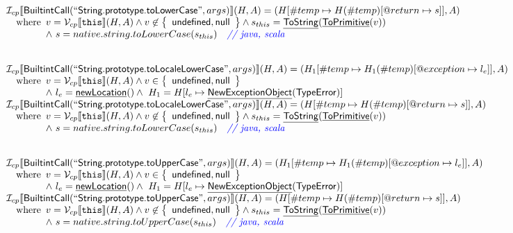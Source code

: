 \documentclass{article}
\makeatletter
\newcommand{\SF}[1]{\mbox{\textsf{#1}}}
\newcommand{\TT}[1]{\mbox{\texttt{#1}}}
\newcommand{\comment}[1]{\textit{#1}}
\newcommand{\wherec}[1]{{\rm where}\begin{array}[t]{l}#1\end{array}}
\newcommand{\I}{\mathcal{I}}
\newcommand{\V}{\mathcal{V}}
\newcommand{\set}[1]{\left\{\begin{array}{l}#1\end{array}\right\}}
\newcommand{\lbr}{\llbracket}
\newcommand{\rbr}{\rrbracket}
\newcommand{\hf}[1]{\underline{\sf #1}}
\newcommand{\varloc}[1]{\##1}
\newcommand{\varprop}[1]{@#1}
\def\inblue{\color{blue}}
\def\inblue{\color{blue}}
\makeatother
\begin{document}
\[\begin{array}{l}
\I _{cp}\lbr \SF{BuiltintCall}(``\SF{String.prototype.toLowerCase}",args)\rbr(H,A)
 = (H[\varloc{temp}\mapsto H(\varloc{temp})[\varprop{return}\mapsto s]], A) \\
\quad\wherec{
  v = \V _{cp}\lbr \TT{this}\rbr (H,A) \land v \not\in \set{\SF{undefined}, \SF{null}}
  \land s_{this} = \hf{ToString}(\hf{ToPrimitive}(v))\\
  \land\ s = native.string.toLowerCase(s_{this}) \quad\comment{{\inblue // java, scala}}\\
  }\\
\\\\



\I _{cp}\lbr \SF{BuiltintCall}(``\SF{String.prototype.toLocaleLowerCase}",args)\rbr(H,A)
 = (H_1[\varloc{temp}\mapsto H_1(\varloc{temp})[\varprop{exception}\mapsto l_e]], A) \\
\quad\wherec{
  v = \V _{cp}\lbr \TT{this}\rbr (H,A) \land v \in \set{\SF{undefined}, \SF{null}}\\
  \land\ l_e = \hf{newLocation}() \land\ H_1=H[l_e\mapsto\hf{NewExceptionObject}(\SF{TypeError})] 
  }\\
  
\I _{cp}\lbr \SF{BuiltintCall}(``\SF{String.prototype.toLocaleLowerCase}",args)\rbr(H,A)
 = (H[\varloc{temp}\mapsto H(\varloc{temp})[\varprop{return}\mapsto s]], A) \\
\quad\wherec{
  v = \V _{cp}\lbr \TT{this}\rbr (H,A) \land v \not\in \set{\SF{undefined}, \SF{null}}
  \land s_{this} = \hf{ToString}(\hf{ToPrimitive}(v))\\
  \land\ s = native.string.toLowerCase(s_{this}) \quad\comment{{\inblue // java, scala}}\\
  }\\
\\\\


  
\I _{cp}\lbr \SF{BuiltintCall}(``\SF{String.prototype.toUpperCase}",args)\rbr(H,A)
 = (H_1[\varloc{temp}\mapsto H_1(\varloc{temp})[\varprop{exception}\mapsto l_e]], A) \\
\quad\wherec{
  v = \V _{cp}\lbr \TT{this}\rbr (H,A) \land v \in \set{\SF{undefined}, \SF{null}}\\
  \land\ l_e = \hf{newLocation}() \land\ H_1=H[l_e\mapsto\hf{NewExceptionObject}(\SF{TypeError})] 
  }\\
  
\I _{cp}\lbr \SF{BuiltintCall}(``\SF{String.prototype.toUpperCase}",args)\rbr(H,A)
 = (H[\varloc{temp}\mapsto H(\varloc{temp})[\varprop{return}\mapsto s]], A) \\
\quad\wherec{
  v = \V _{cp}\lbr \TT{this}\rbr (H,A) \land v \not\in \set{\SF{undefined}, \SF{null}}
  \land s_{this} = \hf{ToString}(\hf{ToPrimitive}(v))\\
  \land\ s = native.string.toUpperCase(s_{this}) \quad\comment{{\inblue // java, scala}}\\
  }\\
\\\\



\end{array}\]
\end{document}
